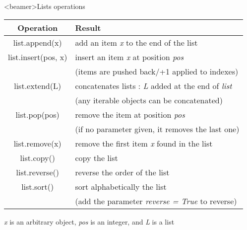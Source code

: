 
\begin{frame}<beamer>{Lists operations}

  \begin{center}

  \begin{tabular}{| c | l |}
    \hline
    \textbf{Operation} & \textbf{Result} \\
    \hline
    list.append(x) 		& add an item \textit{x} to the end of the list \\
    list.insert(pos, x) 	& insert an item \textit{x} at position \textit{pos} \\
     					& {\footnotesize(items are pushed back/+1 applied to indexes) } \\
    list.extend(L) 		& concatenates lists : \textit{L} added at the end of \textit{list} \\
     					& {\footnotesize(any iterable objects can be concatenated) } \\
    list.pop(pos) 		& remove the item at position \textit{pos} \\
     					& {\footnotesize(if no parameter given, it removes the last one) } \\
    list.remove(x) 		& remove the first item \textit{x} found in the list \\
    list.copy() 		& copy the list \\
    list.reverse() 		& reverse the order of the list \\
    list.sort() 		& sort alphabetically the list \\
     					& {\footnotesize(add the parameter \textit{reverse = True} to reverse) } \\
    \hline
  \end{tabular}


  \medskip

  \textit{x} is an arbitrary object, \textit{pos} is an integer, and \textit{L} is a list

  \end{center}

\end{frame}


